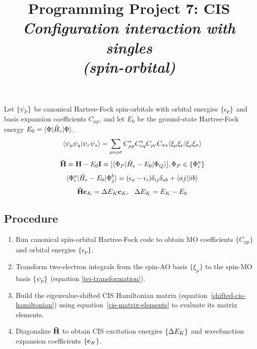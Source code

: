 \documentclass[fleqn]{article}
\title{Programming Project 7: CIS\\
\textit{Configuration interaction with singles\\(spin-orbital)}}
\author{}
\date{}
\begin{document}
\maketitle
\vspace{-1cm}
\noindent
Let $\{\psi_p\}$ be canonical Hartree-Fock spin-orbitals with orbital energies $\{\epsilon_p\}$ and basis expansion coefficients $C_{\mu p}$, and let $E_0$ be the ground-state Hartree-Fock energy $E_0=\langle\Phi|\hat{H}_e|\Phi\rangle$.
\begin{align}
\label{tei-transformation}
&&
  \langle\psi_p\psi_q|\psi_r\psi_s\rangle
=
  \sum_{\mu\nu\rho\sigma}
  C_{\mu p}^*C_{\nu q}^* C_{\rho r}C_{\sigma s}
  \langle\xi_\mu\xi_\nu|\xi_\rho\xi_\sigma\rangle
\end{align}
\begin{align}
\label{shifted-cis-hamiltonian}
&&
  \mathbf{\tilde{H}}
=
  \mathbf{H} - E_0\mathbf{I}
=
  [\langle\Phi_P|\hat{H}_e-E_0|\Phi_Q\rangle], \Phi_P\in\{\Phi_i^a\}
\end{align}
\begin{align}
\label{cis-matrix-elements}
&&
  \langle\Phi_i^a|\hat{H}_e-E_0|\Phi_j^b\rangle
=
  (\epsilon_a-\epsilon_i)\delta_{ij}\delta_{ab}
+
  \langle aj||ib\rangle
\end{align}
\begin{align}
&&
  \bo{\tl{H}}\bo{c}_K
=
  \D E_K\bo{c}_K,
\ \ 
  \D E_K
=
  E_K - E_0
\end{align}


\subsection*{Procedure}

\begin{enumerate}
  \item Run canonical spin-orbital Hartree-Fock code to obtain MO coefficients $\{C_{\mu p}\}$ and orbital energies $\{\epsilon_p\}$.
  \item Transform two-electron integrals from the spin-AO basis $\{\xi_\mu\}$ to the spin-MO basis $\{\psi_p\}$ (equation \ref{tei-transformation}).
  \item Build the eigenvalue-shifted CIS Hamiltonian matrix (equation~\ref{shifted-cis-hamiltonian}) using equation~\ref{cis-matrix-elements} to evaluate its matrix elements.
  \item Diagonalize $\mathbf{\tilde{H}}$ to obtain CIS excitation energies $\{\Delta E_K\}$ and wavefunction expansion coefficients $\{\mathbf{c}_K\}$.
\end{enumerate}
\end{document}
